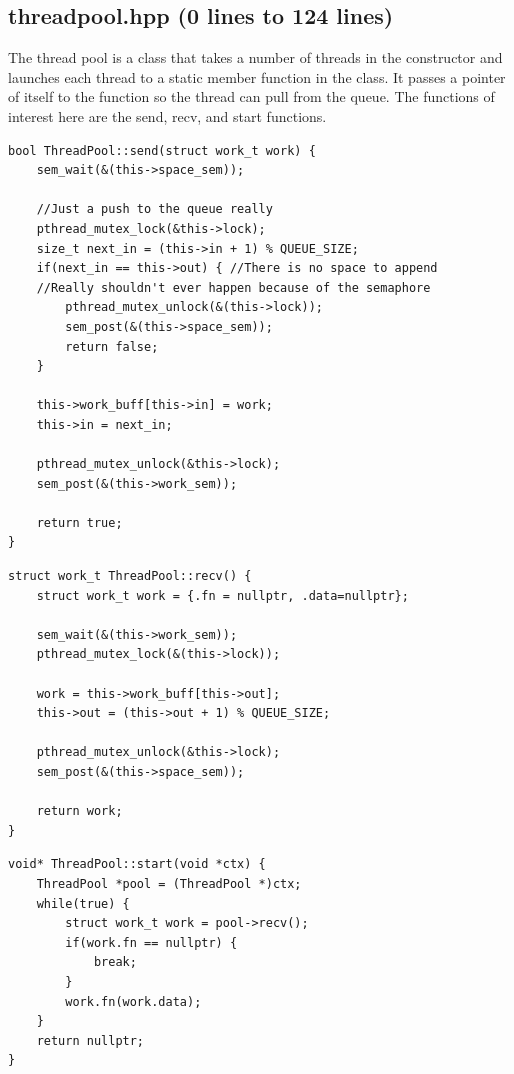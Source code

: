 \documentclass{article}
\begin{document}
\subsection{threadpool.hpp (0 lines to 124 lines)}
The thread pool is a class that takes a number of threads in the constructor and launches each thread to a
static member function in the class. It passes a pointer of itself to the function so the thread can pull 
from the queue. The functions of interest here are the send, recv, and start functions.

\begin{multicols}{2}

\begin{verbatim}
bool ThreadPool::send(struct work_t work) {
    sem_wait(&(this->space_sem));

    //Just a push to the queue really
    pthread_mutex_lock(&this->lock);
    size_t next_in = (this->in + 1) % QUEUE_SIZE;
    if(next_in == this->out) { //There is no space to append
    //Really shouldn't ever happen because of the semaphore
        pthread_mutex_unlock(&(this->lock)); 
        sem_post(&(this->space_sem));
        return false;
    }

    this->work_buff[this->in] = work;
    this->in = next_in;

    pthread_mutex_unlock(&this->lock);
    sem_post(&(this->work_sem));
    
    return true;
}
\end{verbatim}

\begin{verbatim}
struct work_t ThreadPool::recv() {
    struct work_t work = {.fn = nullptr, .data=nullptr};
    
    sem_wait(&(this->work_sem));
    pthread_mutex_lock(&(this->lock));

    work = this->work_buff[this->out];
    this->out = (this->out + 1) % QUEUE_SIZE;

    pthread_mutex_unlock(&this->lock);
    sem_post(&(this->space_sem));

    return work;
}
\end{verbatim}

\begin{verbatim}
void* ThreadPool::start(void *ctx) {
    ThreadPool *pool = (ThreadPool *)ctx;
    while(true) {
        struct work_t work = pool->recv();
        if(work.fn == nullptr) {
            break;
        }
        work.fn(work.data);
    }
    return nullptr;
}
\end{verbatim}

\end{multicols}
\end{document}
